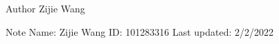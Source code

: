 \begin{DoxyAuthor}{Author}
Zijie Wang
\end{DoxyAuthor}
\begin{DoxyNote}{Note}
Name\+: Zijie Wang ID\+: 101283316 Last updated\+: 2/2/2022 
\end{DoxyNote}
